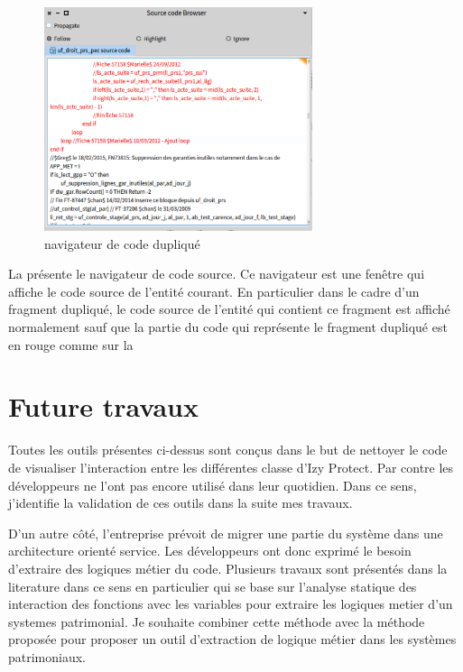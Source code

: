 \documentclass[a4paper]{article}
\begin{document}
\begin{figure}[htbp]
  \begin{center}
  \includegraphics[width=0.7\textwidth]{./figures/sourceCodeBrowser.png}
  \caption{navigateur de code dupliqué}
  \label{fig:sourceCodeBrowser}
\end{center}
\vspace{-0.3cm}
\end{figure}
La  présente le navigateur de code source. 
Ce navigateur est une fenêtre qui affiche le code source de l'entité courant.
En particulier dans le cadre d'un fragment dupliqué, le code source de l'entité qui contient ce fragment est affiché normalement sauf que la partie du code qui représente le fragment dupliqué est en rouge comme sur la 

\section{Future travaux}
\label{sec:roadmap}
Toutes les outils présentes ci-dessus sont conçus dans le but de nettoyer le code de visualiser l'interaction entre les différentes classe d'Izy Protect.
Par contre les développeurs ne l'ont pas encore utilisé dans leur quotidien.
Dans ce sens, j'identifie la validation de ces outils dans la suite mes travaux.

D'un autre côté, l'entreprise prévoit de migrer une partie du système dans une architecture orienté service. 
Les développeurs ont donc exprimé le besoin d'extraire des logiques métier du code.
Plusieurs travaux sont présentés dans la literature dans ce sens en particulier \cite{Lei05a} qui se base sur l'analyse statique des interaction des fonctions avec les variables pour extraire les logiques metier d'un systemes patrimonial. 
Je souhaite combiner cette méthode avec la méthode proposée \cite{anqu19a} pour proposer un outil d'extraction de logique métier dans les systèmes patrimoniaux.
\end{document}
